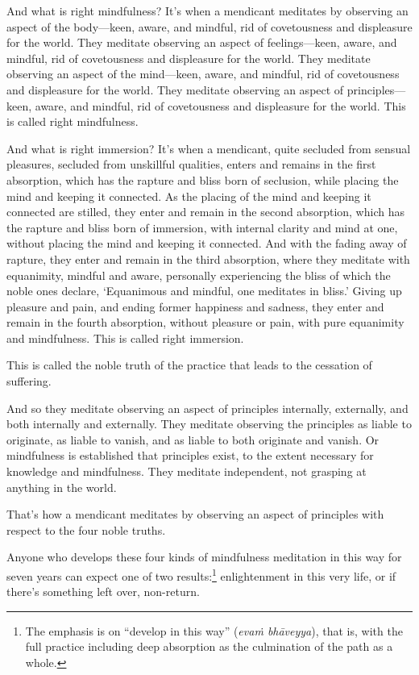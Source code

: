 \documentclass[12pt,openany]{book}%
\begin{document}
And what is right mindfulness? It’s when a mendicant meditates by observing an aspect of the body—keen, aware, and mindful, rid of covetousness and displeasure for the world. They meditate observing an aspect of feelings—keen, aware, and mindful, rid of covetousness and displeasure for the world. They meditate observing an aspect of the mind—keen, aware, and mindful, rid of covetousness and displeasure for the world. They meditate observing an aspect of principles—keen, aware, and mindful, rid of covetousness and displeasure for the world. This is called right mindfulness. 

And what is right immersion? It’s when a mendicant, quite secluded from sensual pleasures, secluded from unskillful qualities, enters and remains in the first absorption, which has the rapture and bliss born of seclusion, while placing the mind and keeping it connected. As the placing of the mind and keeping it connected are stilled, they enter and remain in the second absorption, which has the rapture and bliss born of immersion, with internal clarity and mind at one, without placing the mind and keeping it connected. And with the fading away of rapture, they enter and remain in the third absorption, where they meditate with equanimity, mindful and aware, personally experiencing the bliss of which the noble ones declare, ‘Equanimous and mindful, one meditates in bliss.’ Giving up pleasure and pain, and ending former happiness and sadness, they enter and remain in the fourth absorption, without pleasure or pain, with pure equanimity and mindfulness. This is called right immersion. 

This is called the noble truth of the practice that leads to the cessation of suffering. 

And so they meditate observing an aspect of principles internally, externally, and both internally and externally. They meditate observing the principles as liable to originate, as liable to vanish, and as liable to both originate and vanish. Or mindfulness is established that principles exist, to the extent necessary for knowledge and mindfulness. They meditate independent, not grasping at anything in the world. 

That’s how a mendicant meditates by observing an aspect of principles with respect to the four noble truths. 

Anyone who develops these four kinds of mindfulness meditation in this way for seven years can expect one of two results:\footnote{The emphasis is on “develop in this way” (\textit{\textsanskrit{evaṁ} \textsanskrit{bhāveyya}}), that is, with the full practice including deep absorption as the culmination of the path as a whole. } enlightenment in this very life, or if there’s something left over, non-return. 
\end{document}
